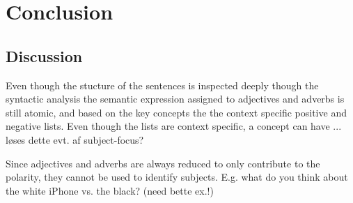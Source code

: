 
\chapter{Conclusion}
\label{chap:Conclusion}

\section{Discussion}
Even though the stucture of the sentences is inspected deeply though the syntactic analysis the semantic expression assigned to adjectives and adverbs is still atomic, and based on the key concepts the the context specific positive and negative lists. Even though the lists are context specific, a concept can have ... løses dette evt. af subject-focus?


Since adjectives and adverbs are always reduced to only contribute to the polarity, they cannot be used to identify subjects. E.g. what do you think about the white iPhone vs. the black? (need bette ex.!)